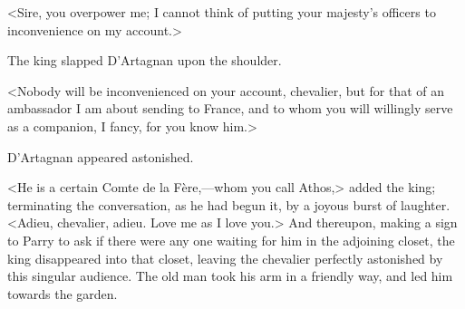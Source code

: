 <Sire, you overpower me; I cannot think of putting your majesty's officers to inconvenience on my account.>

The king slapped D'Artagnan upon the shoulder.

<Nobody will be inconvenienced on your account, chevalier, but for that of an ambassador I am about sending to France, and to whom you will willingly serve as a companion, I fancy, for you know him.>

D'Artagnan appeared astonished.

<He is a certain Comte de la Fère,—whom you call Athos,> added the king; terminating the conversation, as he had begun it, by a joyous burst of laughter. <Adieu, chevalier, adieu. Love me as I love you.> And thereupon, making a sign to Parry to ask if there were any one waiting for him in the adjoining closet, the king disappeared into that closet, leaving the chevalier perfectly astonished by this singular audience. The old man took his arm in a friendly way, and led him towards the garden. 